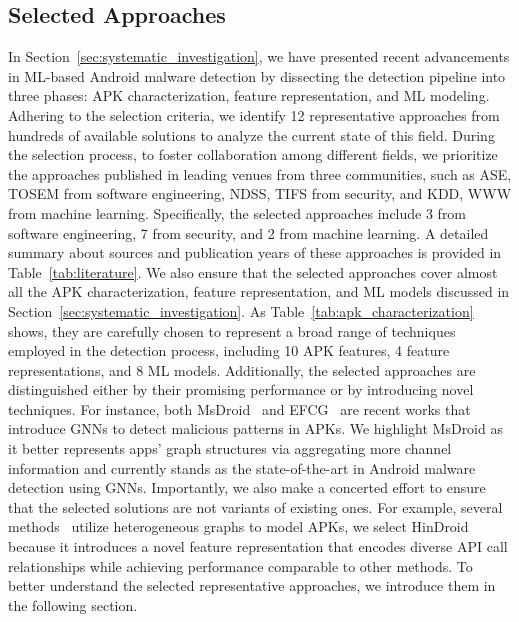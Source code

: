 \subsection{Selected Approaches}
\label{sub:selected_approaches}

In Section~\ref{sec:systematic_investigation}, we have presented recent advancements in ML-based Android malware detection by dissecting the detection pipeline into three phases: APK characterization, feature representation, and ML modeling.
Adhering to the selection criteria, we identify 12 representative approaches from hundreds of available solutions to analyze the current state of this field.
During the selection process, to foster collaboration among different fields, we prioritize the approaches published in leading venues from three communities, such as ASE, TOSEM from software engineering, NDSS, TIFS from security, and KDD, WWW from machine learning.
Specifically, the selected approaches include 3 from software engineering, 7 from security, and 2 from machine learning.
A detailed summary about sources and publication years of these approaches is provided in Table~\ref{tab:literature}.
We also ensure that the selected approaches cover almost all the APK characterization, feature representation, and ML models discussed in Section~\ref{sec:systematic_investigation}.
As Table~\ref{tab:apk_characterization} shows, they are carefully chosen to represent a broad range of techniques employed in the detection process, including 10 APK features, 4 feature representations, and 8 ML models.
Additionally, the selected approaches are distinguished either by their promising performance or by introducing novel techniques.
For instance, both MsDroid~\cite{he2022msdroid} and EFCG~\cite{cai2021learning} are recent works that introduce GNNs to detect malicious patterns in APKs.
We highlight MsDroid as it better represents apps' graph structures via aggregating more channel information and currently stands as the state-of-the-art in Android malware detection using GNNs.
Importantly, we also make a concerted effort to ensure that the selected solutions are not variants of existing ones.
For example, several methods~\cite{hou2017hindroid,ye2019out,fan2021heterogeneous} utilize heterogeneous graphs to model APKs, we select HinDroid~\cite{hou2017hindroid} because it introduces a novel feature representation that encodes diverse API call relationships while achieving performance comparable to other methods.
To better understand the selected representative approaches, we introduce them in the following section.
